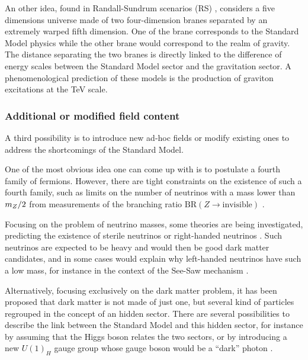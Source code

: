     An other idea, found in Randall-Sundrum scenarios (RS) \cite{RS}, considers
    a five dimensions universe made of two four-dimension branes separated by an
    extremely warped fifth dimension. One of the brane corresponds to the
    Standard Model physics while the other brane would correspond to the realm
    of gravity. The distance separating the two branes is directly linked to the
    difference of energy scales between the Standard Model sector and the
    gravitation sector. A phenomenological prediction of these models is the
    production of graviton excitations at the TeV scale.

    \subsubsection{Additional or modified field content}

    A third possibility is to introduce new ad-hoc fields or modify existing
    ones to address the shortcomings of the Standard Model.

    One of the most obvious idea one can come up with is to postulate a fourth
    family of fermions. However, there are tight constraints on the existence of
    such a fourth family, such as limits on the number of neutrinos with a mass
    lower than $m_{Z}/2$ from measurements of the branching ratio
    $\text{BR}(Z \rightarrow \text{invisible})$ \cite{PDFNumberOfNeutrinos}.

    Focusing on the problem of neutrino masses, some theories are being
    investigated, predicting the existence of sterile neutrinos or right-handed
    neutrinos \cite{RHNeutrinos}. Such neutrinos are expected to be heavy and
    would then be good dark matter candidates, and in some cases would explain
    why left-handed neutrinos have such a low mass, for instance in the context
    of the See-Saw mechanism \cite{Seesaw}.

    Alternatively, focusing exclusively on the dark matter problem, it has been
    proposed that dark matter is not made of just one, but several kind of
    particles regrouped in the concept of an hidden sector. There are several
    possibilities to describe the link between the Standard Model and this
    hidden sector, for instance by assuming that the Higgs boson relates the two
    sectors, or by introducing a new $U(1)_H$ gauge group whose gauge boson
    would be a ``dark'' photon \cite{darkPhoton}.

